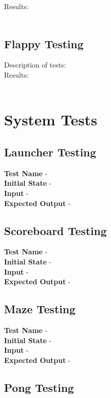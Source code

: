 \documentclass[12pt, titlepage]{article}
\begin{document}
		Results: \\ \\
		
	\subsection{Flappy Testing}
		Description of tests: \\
		
		Results: \\ \\
		
\section{System Tests}

\subsection{Launcher Testing}

\textbf{Test Name} - \\
\textbf{Initial State} - \\
\textbf{Input} - \\
\textbf{Expected Output} - \\

\subsection{Scoreboard Testing}

\textbf{Test Name} - \\
\textbf{Initial State} - \\
\textbf{Input} - \\
\textbf{Expected Output} - \\

\subsection{Maze Testing}

\textbf{Test Name} - \\
\textbf{Initial State} - \\
\textbf{Input} - \\
\textbf{Expected Output} - \\

\subsection{Pong Testing}
\end{document}
